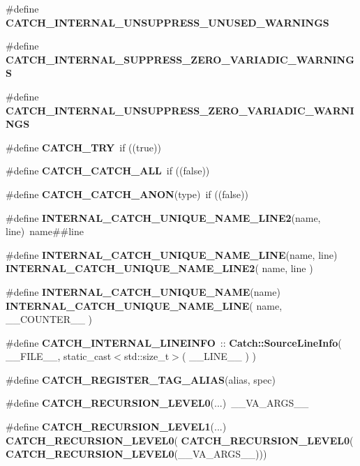 \begin{DoxyCompactItemize}
\item 
\#define \textbf{ C\+A\+T\+C\+H\+\_\+\+I\+N\+T\+E\+R\+N\+A\+L\+\_\+\+U\+N\+S\+U\+P\+P\+R\+E\+S\+S\+\_\+\+U\+N\+U\+S\+E\+D\+\_\+\+W\+A\+R\+N\+I\+N\+GS}
\item 
\#define \textbf{ C\+A\+T\+C\+H\+\_\+\+I\+N\+T\+E\+R\+N\+A\+L\+\_\+\+S\+U\+P\+P\+R\+E\+S\+S\+\_\+\+Z\+E\+R\+O\+\_\+\+V\+A\+R\+I\+A\+D\+I\+C\+\_\+\+W\+A\+R\+N\+I\+N\+GS}
\item 
\#define \textbf{ C\+A\+T\+C\+H\+\_\+\+I\+N\+T\+E\+R\+N\+A\+L\+\_\+\+U\+N\+S\+U\+P\+P\+R\+E\+S\+S\+\_\+\+Z\+E\+R\+O\+\_\+\+V\+A\+R\+I\+A\+D\+I\+C\+\_\+\+W\+A\+R\+N\+I\+N\+GS}
\item 
\#define \textbf{ C\+A\+T\+C\+H\+\_\+\+T\+RY}~if ((true))
\item 
\#define \textbf{ C\+A\+T\+C\+H\+\_\+\+C\+A\+T\+C\+H\+\_\+\+A\+LL}~if ((false))
\item 
\#define \textbf{ C\+A\+T\+C\+H\+\_\+\+C\+A\+T\+C\+H\+\_\+\+A\+N\+ON}(type)~if ((false))
\item 
\#define \textbf{ I\+N\+T\+E\+R\+N\+A\+L\+\_\+\+C\+A\+T\+C\+H\+\_\+\+U\+N\+I\+Q\+U\+E\+\_\+\+N\+A\+M\+E\+\_\+\+L\+I\+N\+E2}(name,  line)~name\#\#line
\item 
\#define \textbf{ I\+N\+T\+E\+R\+N\+A\+L\+\_\+\+C\+A\+T\+C\+H\+\_\+\+U\+N\+I\+Q\+U\+E\+\_\+\+N\+A\+M\+E\+\_\+\+L\+I\+NE}(name,  line)~\textbf{ I\+N\+T\+E\+R\+N\+A\+L\+\_\+\+C\+A\+T\+C\+H\+\_\+\+U\+N\+I\+Q\+U\+E\+\_\+\+N\+A\+M\+E\+\_\+\+L\+I\+N\+E2}( name, line )
\item 
\#define \textbf{ I\+N\+T\+E\+R\+N\+A\+L\+\_\+\+C\+A\+T\+C\+H\+\_\+\+U\+N\+I\+Q\+U\+E\+\_\+\+N\+A\+ME}(name)~\textbf{ I\+N\+T\+E\+R\+N\+A\+L\+\_\+\+C\+A\+T\+C\+H\+\_\+\+U\+N\+I\+Q\+U\+E\+\_\+\+N\+A\+M\+E\+\_\+\+L\+I\+NE}( name, \+\_\+\+\_\+\+C\+O\+U\+N\+T\+E\+R\+\_\+\+\_\+ )
\item 
\#define \textbf{ C\+A\+T\+C\+H\+\_\+\+I\+N\+T\+E\+R\+N\+A\+L\+\_\+\+L\+I\+N\+E\+I\+N\+FO}~\+::\textbf{ Catch\+::\+Source\+Line\+Info}( \+\_\+\+\_\+\+F\+I\+L\+E\+\_\+\+\_\+, static\+\_\+cast$<$std\+::size\+\_\+t$>$( \+\_\+\+\_\+\+L\+I\+N\+E\+\_\+\+\_\+ ) )
\item 
\#define \textbf{ C\+A\+T\+C\+H\+\_\+\+R\+E\+G\+I\+S\+T\+E\+R\+\_\+\+T\+A\+G\+\_\+\+A\+L\+I\+AS}(alias,  spec)
\item 
\#define \textbf{ C\+A\+T\+C\+H\+\_\+\+R\+E\+C\+U\+R\+S\+I\+O\+N\+\_\+\+L\+E\+V\+E\+L0}(...)~\+\_\+\+\_\+\+V\+A\+\_\+\+A\+R\+G\+S\+\_\+\+\_\+
\item 
\#define \textbf{ C\+A\+T\+C\+H\+\_\+\+R\+E\+C\+U\+R\+S\+I\+O\+N\+\_\+\+L\+E\+V\+E\+L1}(...)~\textbf{ C\+A\+T\+C\+H\+\_\+\+R\+E\+C\+U\+R\+S\+I\+O\+N\+\_\+\+L\+E\+V\+E\+L0}(\textbf{ C\+A\+T\+C\+H\+\_\+\+R\+E\+C\+U\+R\+S\+I\+O\+N\+\_\+\+L\+E\+V\+E\+L0}(\textbf{ C\+A\+T\+C\+H\+\_\+\+R\+E\+C\+U\+R\+S\+I\+O\+N\+\_\+\+L\+E\+V\+E\+L0}(\+\_\+\+\_\+\+V\+A\+\_\+\+A\+R\+G\+S\+\_\+\+\_\+)))

\end{DoxyCompactItemize}
